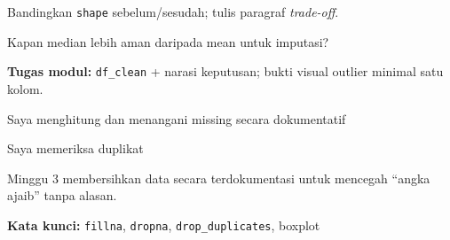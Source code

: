 \documentclass[../main.tex]{subfiles}
\begin{document}
\begin{aktivitas}
  \item Bandingkan \texttt{shape} sebelum/sesudah; tulis paragraf \textit{trade-off}.
\end{aktivitas}

\begin{latihan}
  \item Kapan median lebih aman daripada mean untuk imputasi?
\end{latihan}

\begin{asesmen}
\textbf{Tugas modul:} \texttt{df\_clean} + narasi keputusan; bukti visual outlier minimal satu kolom.
\end{asesmen}

\begin{checklist}
  \item Saya menghitung dan menangani missing secara dokumentatif
  \item Saya memeriksa duplikat
\end{checklist}

\begin{rangkuman}
Minggu 3 membersihkan data secara terdokumentasi untuk mencegah ``angka ajaib'' tanpa alasan.

\textbf{Kata kunci:} \texttt{fillna}, \texttt{dropna}, \texttt{drop\_duplicates}, boxplot
\end{rangkuman}
\end{document}
